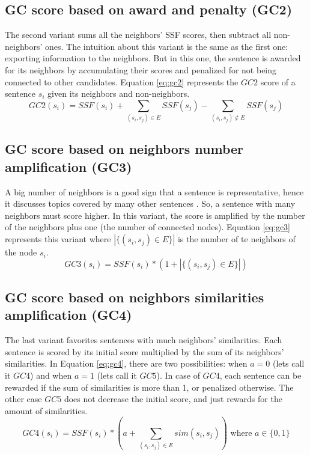 \subsection{GC score based on award and penalty (GC2)}

The second variant sums all the neighbors' SSF scores, then subtract all non-neighbors' ones.
The intuition about this variant is the same as the first one: exporting information to the neighbors. 
But in this one, the sentence is awarded for its neighbors by accumulating their scores and penalized for not being connected to other candidates.
Equation \ref{eq:gc2} represents the $ GC2 $ score of a sentence $ s_i $ given its neighbors and non-neighbors.
\begin{equation}
	GC2(s_i) = SSF(s_i) + \sum\limits_{(s_i, s_j) \in E} SSF(s_j) - \sum\limits_{(s_i, s_j) \notin E} SSF(s_j)
	\label{eq:gc2}
\end{equation}

\subsection{GC score based on neighbors number amplification (GC3)}

A big number of neighbors is a good sign that a sentence is representative, hence it discusses topics covered by many other sentences \citep{97-salton-al}.
So, a sentence with many neighbors must score higher. 
In this variant, the score is amplified by the number of the neighbors plus one (the number of connected nodes). 
Equation \ref{eq:gc3} represents this variant where $ |\{(s_i, s_j) \in E\}| $ is the number of te neighbors of the node $ s_i $.
\begin{equation}
	GC3(s_i) = SSF(s_i) * (1 + |\{(s_i, s_j) \in E\}|)
	\label{eq:gc3}
\end{equation}


\subsection{GC score based on neighbors similarities amplification (GC4)}

The last variant favorites sentences  with much neighbors' similarities. 
Each sentence is scored by its initial score multiplied by the sum of its neighbors' similarities. 
In Equation \ref{eq:gc4}, there are two possibilities: when $ a = 0 $ (lets call it $ GC4 $) and when $ a = 1 $ (lets call it $ GC5 $). 
In case of $ GC4 $, each sentence can be rewarded if the sum of similarities is more than 1, or penalized otherwise. 
The other case $ GC5 $ does not decrease the initial score, and just rewards for the amount of similarities.
\begin{equation}
	GC4(s_i) = SSF(s_i) * ( a + \sum\limits_{(s_i, s_j) \in E} sim(s_i, s_j)) \text{ where } a \in \{0, 1\}
	\label{eq:gc4}
\end{equation}

